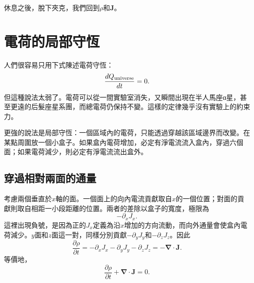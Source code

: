 \begin{classroomqa}
\end{classroomqa}

\begin{classroomqa}
\end{classroomqa}

休息之後，脫下夾克，我們回到\(\rho\)和\(\mathbf J\)。

\section{電荷的局部守恆}

人們很容易只用下式陳述電荷守恆：
\begin{equation}
\frac{dQ_{\rm universe}}{dt}=0.
\end{equation}
但這種說法太弱了。電荷可以從一間實驗室消失，又瞬間出現在半人馬座{\proseunicodefont α}星，甚至更遠的后髮座星系團，而總電荷仍保持不變。這樣的定律幾乎沒有實驗上的約束力。

更強的說法是局部守恆：一個區域內的電荷，只能透過穿越該區域邊界而改變。在某點周圍放一個小盒子。如果盒內電荷增加，必定有淨電流流入盒內，穿過六個面；如果電荷減少，則必定有淨電流流出盒外。

\subsection{穿過相對兩面的通量}

考慮兩個垂直於\(x\)軸的面。一個面上的向內電流貢獻取自\(x\)的一個位置；對面的貢獻則取自相距一小段距離的位置。兩者的差除以盒子的寬度，極限為
\begin{equation}
-\partial_xJ_x.
\end{equation}
這裡出現負號，是因為正的\(J_x\)定義為沿\(x\)增加的方向流動，而向外通量會使盒內電荷減少。\(y\)面和\(z\)面這一對，同樣分別貢獻\(-\partial_yJ_y\)和\(-\partial_zJ_z\)。因此
\begin{equation}
\frac{\partial\rho}{\partial t}
=
-\partial_xJ_x-\partial_yJ_y-\partial_zJ_z
=
-\boldsymbol\nabla\cdot\mathbf J.
\end{equation}
等價地，
\begin{equation}
\boxed{
\frac{\partial\rho}{\partial t}
+\boldsymbol\nabla\cdot\mathbf J=0
}.
\label{eq:continuity}
\end{equation}

